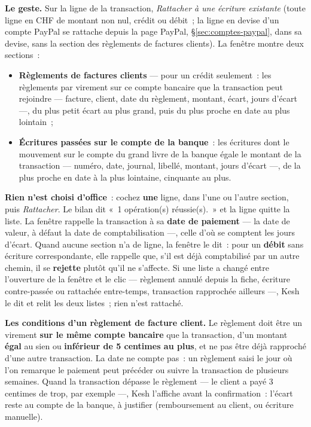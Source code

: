 \documentclass[a4paper,11pt,oneside]{article}
\begin{document}
\textbf{Le geste.} Sur la ligne de la transaction, \emph{Rattacher à une écriture existante} (toute ligne en CHF de montant non nul, crédit ou débit~; la ligne en devise d'un compte PayPal se rattache depuis la page PayPal, \S\ref{sec:comptes-paypal}, dans sa devise, sans la section des règlements de factures clients). La fenêtre montre deux sections~:
\begin{itemize}
    \item \textbf{Règlements de factures clients} --- pour un crédit seulement~: les règlements par virement sur ce compte bancaire que la transaction peut rejoindre --- facture, client, date du règlement, montant, écart, jours d'écart ---, du plus petit écart au plus grand, puis du plus proche en date au plus lointain~;
    \item \textbf{Écritures passées sur le compte de la banque}~: les écritures dont le mouvement sur le compte du grand livre de la banque égale le montant de la transaction --- numéro, date, journal, libellé, montant, jours d'écart ---, de la plus proche en date à la plus lointaine, cinquante au plus.
\end{itemize}
\textbf{Rien n'est choisi d'office}~: cochez \textbf{une} ligne, dans l'une ou l'autre section, puis \emph{Rattacher}. Le bilan dit «~1 opération(s) réussie(s).~» et la ligne quitte la liste. La fenêtre rappelle la transaction à sa \textbf{date de paiement} --- la date de valeur, à défaut la date de comptabilisation ---, celle d'où se comptent les jours d'écart. Quand aucune section n'a de ligne, la fenêtre le dit~: pour un \textbf{débit} sans écriture correspondante, elle rappelle que, s'il est déjà comptabilisé par un autre chemin, il se \textbf{rejette} plutôt qu'il ne s'affecte. Si une liste a changé entre l'ouverture de la fenêtre et le clic --- règlement annulé depuis la fiche, écriture contre-passée ou rattachée entre-temps, transaction rapprochée ailleurs ---, Kesh le dit et relit les deux listes~; rien n'est rattaché.

\textbf{Les conditions d'un règlement de facture client.} Le règlement doit être un virement \textbf{sur le même compte bancaire} que la transaction, d'un montant \textbf{égal} au sien ou \textbf{inférieur de 5 centimes au plus}, et ne pas être déjà rapproché d'une autre transaction. La date ne compte pas~: un règlement saisi le jour où l'on remarque le paiement peut précéder ou suivre la transaction de plusieurs semaines. Quand la transaction dépasse le règlement --- le client a payé 3 centimes de trop, par exemple ---, Kesh l'affiche avant la confirmation~: l'écart reste au compte de la banque, à justifier (remboursement au client, ou écriture manuelle).
\end{document}
